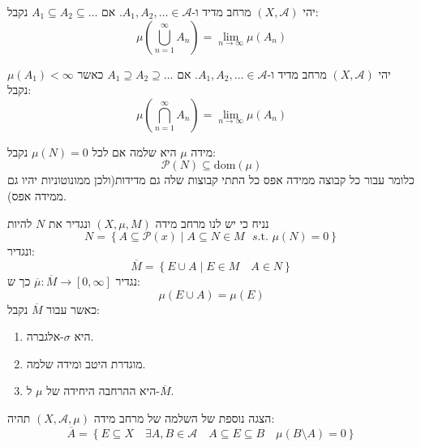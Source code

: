 \documentclass{tstextbook}
\begin{document}
\begin{proposition}
יהי \(\left( X,\mathcal{A} \right)\) מרחב מדיד ו-\(A_{1},A_{2},\dots \in \mathcal{A}\). אם \(A_{1}\subseteq A_{2}\subseteq \dots\) נקבל:
$$\mu\left( \bigcup_{n=1}^{\infty}A_{n} \right)=\lim_{ n \to \infty } \mu(A_{n})$$

\end{proposition}
\begin{proposition}
יהי \(\left( X,\mathcal{A} \right)\) מרחב מדיד ו-\(A_{1},A_{2},\dots \in \mathcal{A}\). אם \(A_{1}\supseteq A_{2}\supseteq \dots\) כאשר \(\mu(A_{1})<\infty\) נקבל:
$$\mu\left( \bigcap_{n=1}^{\infty}A_{n} \right)=\lim_{ n \to \infty } \mu(A_{n})$$

\end{proposition}
\begin{definition}
מידה \(\mu\) היא שלמה אם לכל \(\mu(N)=0\) נקבל:
$$\mathcal{P}\left( N \right) \subseteq \mathrm{dom}\left( \mu \right) $$
כלומר עבור כל קבוצה ממידה אפס כל התתי קבוצות שלה גם מדידות(ולכן ממונוטוניות יהיו גם ממידה אפס).

\end{definition}
\begin{proposition}
נניח כי יש לנו מרחב מידה \(\left( X,\mu, M \right)\) ונגדיר את \(N\) להיות
$$N=\left\{  A\subseteq \mathcal{P}(x) \mid A\subseteq N \in M \text{ \(s\).t. } \mu(N) =0 \right\}$$
ונגדיר:
$$\overline{M} =\left\{   E \cup A \mid E \in M \quad  A \in N  \right\}$$
נגדיר \(\overline{\mu}:\overline{M}\to \left[ 0,\infty \right]\) כך ש:
$$\mu\left( E \cup A \right)=\mu(E)$$
כאשר עבור \(\overline{ M}\) נקבל:

  \begin{enumerate}
    \item היא \(\sigma\)-אלגברה. 


    \item מוגדרת היטב ומידה שלמה. 


    \item היא ההרחבה היחידה של \(\mu\) ל-\(\overline{M}\). 


  \end{enumerate}
\end{proposition}
\begin{remark}
הצגה נוספת של השלמה של מרחב מידה \(\left( X,\mathcal{A},\mu \right)\)  תהיה:
$$\overline{A} =\left\{  E\subseteq X\quad \exists A,B \in \mathcal{A} \quad A\subseteq E\subseteq B\quad  \mu\left( B\setminus  A \right)=0  \right\}$$

\end{remark}
\end{document}

